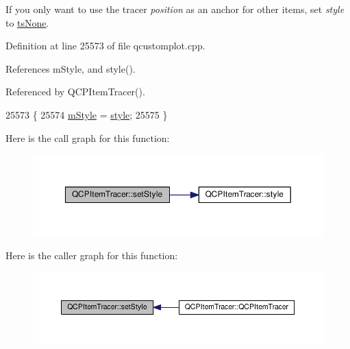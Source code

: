 If you only want to use the tracer {\itshape position} as an anchor for other items, set {\itshape style} to \hyperlink{class_q_c_p_item_tracer_a2f05ddb13978036f902ca3ab47076500aac27462c79146225bfa8fba24d2ee8a4}{ts\+None}. 

Definition at line 25573 of file qcustomplot.\+cpp.



References m\+Style, and style().



Referenced by Q\+C\+P\+Item\+Tracer().


\begin{DoxyCode}
25573                                                            \{
25574   \hyperlink{class_q_c_p_item_tracer_afb1f236bebf417544e0138fef22a292e}{mStyle} = \hyperlink{class_q_c_p_item_tracer_a871832dace1709f877c3136fac7ae1ec}{style};
25575 \}
\end{DoxyCode}


Here is the call graph for this function\+:\nopagebreak
\begin{figure}[H]
\begin{center}
\leavevmode
\includegraphics[width=350pt]{class_q_c_p_item_tracer_a41a2ac4f1acd7897b4e2a2579c03204e_cgraph}
\end{center}
\end{figure}




Here is the caller graph for this function\+:\nopagebreak
\begin{figure}[H]
\begin{center}
\leavevmode
\includegraphics[width=350pt]{class_q_c_p_item_tracer_a41a2ac4f1acd7897b4e2a2579c03204e_icgraph}
\end{center}
\end{figure}


